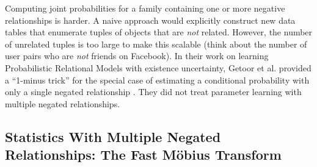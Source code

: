 \documentclass[oribibl]{llncs}
\begin{document}
Computing joint probabilities for a family containing one or more negative relationships is harder. A naive approach would explicitly construct new data tables that enumerate tuples of objects that are {\em not} related. 
However, the number of unrelated tuples is too large to make this scalable (think about the number of user pairs who are {\em not} friends on Facebook). 
In their work on learning Probabilistic Relational Models with existence  uncertainty, Getoor et al. provided a ``1-minus trick'' for the special case of estimating a conditional probability with only a single negated relationship \cite[Sec.5.8.4.2]{Getoor2007c}. They did not treat parameter learning with multiple negated relationships.

\subsection{Statistics With Multiple Negated Relationships: The Fast M\"obius Transform} 
\end{document}
